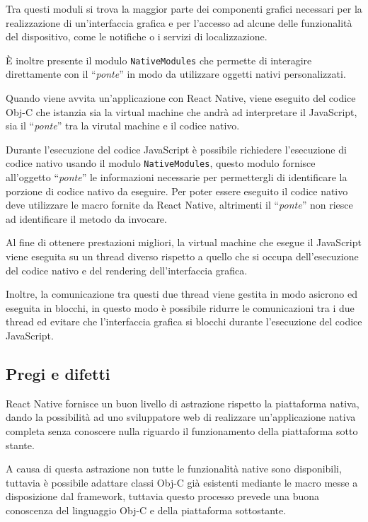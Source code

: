 Tra questi moduli si trova la maggior parte dei componenti grafici necessari per la realizzazione di un'interfaccia grafica e per l'accesso ad alcune delle funzionalità del dispositivo, come le notifiche o i servizi di localizzazione. 

\`E inoltre presente il modulo \texttt{NativeModules} che permette di interagire direttamente con il ``\textit{ponte}'' in modo da utilizzare oggetti nativi personalizzati.

Quando viene avvita un'applicazione con React Native, viene eseguito del codice Obj-C che istanzia sia la virtual machine che andrà ad interpretare il JavaScript, sia il ``\textit{ponte}'' tra la virutal machine e il codice nativo.

Durante l'esecuzione del codice JavaScript è possibile richiedere l'esecuzione di codice nativo usando il modulo \texttt{NativeModules}, questo modulo fornisce all'oggetto ``\textit{ponte}'' le informazioni necessarie per permettergli di identificare la porzione di codice nativo da eseguire.
Per poter essere eseguito il codice nativo deve utilizzare le macro fornite da React Native, altrimenti il ``\textit{ponte}'' non riesce ad identificare il metodo da invocare.

Al fine di ottenere prestazioni migliori, la virtual machine che esegue il JavaScript viene eseguita su un thread diverso rispetto a quello che si occupa dell'esecuzione del codice nativo e del rendering dell'interfaccia grafica.

Inoltre, la comunicazione tra questi due thread viene gestita in modo asicrono ed eseguita in blocchi, in questo modo è possibile ridurre le comunicazioni tra i due thread ed evitare che l'interfaccia grafica si blocchi durante l'esecuzione del codice JavaScript.

\subsection{Pregi e difetti}

React Native fornisce un buon livello di astrazione rispetto la piattaforma nativa, dando la possibilità ad uno sviluppatore web di realizzare un'applicazione nativa completa senza conoscere nulla riguardo il funzionamento della piattaforma sotto stante.

A causa di questa astrazione non tutte le funzionalità native sono disponibili, tuttavia è possibile adattare classi Obj-C già esistenti mediante le macro messe a disposizione dal framework, tuttavia questo processo prevede una buona conoscenza del linguaggio Obj-C e della piattaforma sottostante.

